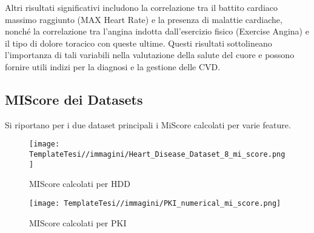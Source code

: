 \begin{flushleft}
Altri risultati significativi includono la correlazione tra il battito cardiaco massimo raggiunto (MAX Heart Rate) e la presenza di malattie cardiache, nonché la correlazione  tra l'angina indotta dall'esercizio fisico (Exercise Angina) e il tipo di dolore toracico con queste ultime. Questi risultati sottolineano l'importanza di tali variabili nella valutazione della salute del cuore e possono fornire utili indizi per la diagnosi e la gestione delle CVD.
\end{flushleft}


\subsection{MIScore dei Datasets}
Si riportano per i due dataset principali i MiScore calcolati per varie feature.

\begin{figure}[H]
    \centering
    \texttt{[image: TemplateTesi//immagini/Heart\_Disease\_Dataset\_8\_mi\_score.png]}
    \caption{MIScore calcolati per HDD}
    \label{fig:miscorehdd}
\end{figure}



\begin{figure}[H]
    \centering
    \texttt{[image: TemplateTesi//immagini/PKI\_numerical\_mi\_score.png]}
    \caption{MIScore calcolati per PKI}
    \label{fig:miscorePKI}
\end{figure}



